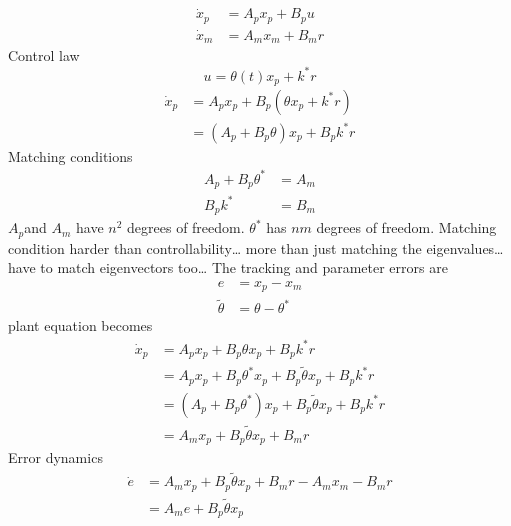 \begin{align*}
  \dot{x}_{p}&=A_{p}x_{p}+B_{p}u \\
  \dot{x}_{m}&=A_{m}x_{m}+B_{m}r
\end{align*}
Control law
\begin{equation*}
  u=\theta(t)x_{p}+k^{*}r
\end{equation*}
\begin{align*}
  \dot{x}_{p}&=A_{p}x_{p}+B_{p}\left(\theta x_{p}+k^{*}r\right) \\
  &=(A_{p}+B_{p}\theta)x_{p}+B_{p}k^{*}r
\end{align*}
Matching conditions
\begin{align*}
  A_{p}+B_{p}\theta^{*}&=A_{m} \\
  B_{p}k^{*}&=B_{m}
\end{align*}
$A_{p}$and $A_{m}$ have $n^{2}$ degrees of freedom.
$\theta^{*}$ has $nm$ degrees of freedom.
Matching condition harder than controllability\ldots
more than just matching the eigenvalues\ldots
have to match eigenvectors too\ldots
The tracking and parameter errors are
\begin{align*}
  e&=x_{p}-x_{m} \\
  \tilde{\theta}&=\theta-\theta^{*}
\end{align*}
plant equation becomes
\begin{align*}
  \dot{x}_{p}&=A_{p}x_{p}+B_{p}\theta x_{p}+B_{p}k^{*}r \\
  &=A_{p}x_{p}+B_{p}\theta^{*}x_{p}+B_{p}\tilde{\theta}x_{p}+B_{p}k^{*}r \\
  &=(A_{p}+B_{p}\theta^{*})x_{p}+B_{p}\tilde{\theta}x_{p}+B_{p}k^{*}r \\
  &=A_{m}x_{p}+B_{p}\tilde{\theta}x_{p}+B_{m}r
\end{align*}
Error dynamics
\begin{align*}
  \dot{e}&=A_{m}x_{p}+B_{p}\tilde{\theta}x_{p}+B_{m}r-A_{m}x_{m}-B_{m}r \\
  &=A_{m}e+B_{p}\tilde{\theta}x_{p}
\end{align*}

\begin{figure}[H]
  \begin{center}
  \end{center}
\end{figure}

